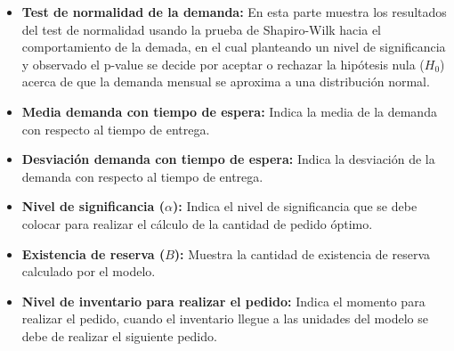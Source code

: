 \begin{itemize}
  \item \textbf{Test de normalidad de la demanda:} En esta parte muestra los resultados del test de normalidad usando la prueba de Shapiro-Wilk hacia el comportamiento de la demada, en el cual planteando un nivel de significancia y observado el p-value se decide por aceptar o rechazar la hipótesis nula ($H_0$) acerca de que la demanda mensual se aproxima a una distribución normal.
  \item \textbf{Media demanda con tiempo de espera:} Indica la media de la demanda con respecto al tiempo de entrega.
  \item \textbf{Desviación demanda con tiempo de espera:} Indica la desviación de la demanda con respecto al tiempo de entrega.
  \item \textbf{Nivel de significancia ($\alpha$):} Indica el nivel de significancia que se debe colocar para realizar el cálculo de la cantidad de pedido óptimo.
  \item \textbf{Existencia de reserva ($B$):} Muestra la cantidad de existencia de reserva calculado por el modelo.
  \item \textbf{Nivel de inventario para realizar el pedido:} Indica el momento para realizar el pedido, cuando el inventario llegue a las unidades del modelo se debe de realizar el siguiente pedido.
\end{itemize}

